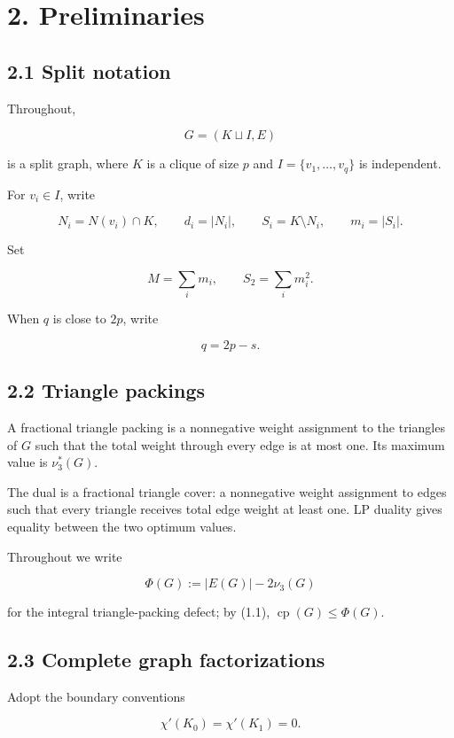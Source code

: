 \documentclass[english,11pt,a4paper]{article}
\begin{document}
\section{2. Preliminaries}\label{preliminaries}

\subsection{2.1 Split notation}\label{split-notation}

Throughout,

\[
G=(K\sqcup I,E)
\]

is a split graph, where \(K\) is a clique of size \(p\) and
\(I=\{v_1,\ldots,v_q\}\) is independent.

For \(v_i\in I\), write

\[
N_i=N(v_i)\cap K,
\qquad
d_i=|N_i|,
\qquad
S_i=K\setminus N_i,
\qquad
m_i=|S_i|.
\]

Set

\[
M=\sum_i m_i,
\qquad
S_2=\sum_i m_i^2.
\]

When \(q\) is close to \(2p\), write

\[
q=2p-s.
\tag{2.1}
\]

\subsection{2.2 Triangle packings}\label{triangle-packings}

A fractional triangle packing is a nonnegative weight assignment to the
triangles of \(G\) such that the total weight through every edge is at
most one. Its maximum value is \(\nu_3^*(G)\).

The dual is a fractional triangle cover: a nonnegative weight assignment
to edges such that every triangle receives total edge weight at least
one. LP duality gives equality between the two optimum values.

Throughout we write

\[
\Phi(G):=|E(G)|-2\nu_3(G)
\]

for the integral triangle-packing defect; by (1.1),
\(\operatorname{cp}(G)\le\Phi(G)\).

\subsection{2.3 Complete graph
factorizations}\label{complete-graph-factorizations}

Adopt the boundary conventions

\[
\chi'(K_0)=\chi'(K_1)=0.
\]
\end{document}
